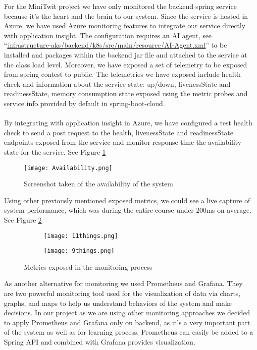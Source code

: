 For the MiniTwit project we have only monitored the backend spring service because it's the heart and the brain to our system. Since the service is hosted in Azure, we have used Azure monitoring features to integrate our service directly with application insight. The configuration requires an AI agent, see “\url{infrastructure-aks/backend/k8s/src/main/resource/AI-Agent.xml}” to be installed and packages within the backend jar file and attached to the service at the class load level. Moreover, we have exposed a set of telemetry to be exposed from spring contest to public. The telemetries we have exposed include health check and information about the service state: up/down, livenessState and readinessState, memory consumption state exposed using the metric probes and service info provided by default in spring-boot-cloud.
\\\\
By integrating with application insight in Azure, we have configured a test health check to send a post request to the health, livenessState and readinessState endpoints exposed from the service and monitor response time the availability state for the service. See Figure \ref{fig:availability} 
\begin{figure}[h]
    \centering
    \texttt{[image: Availability.png]}
    \caption{Screenshot taken of the availability of the system}
    \label{fig:availability}
\end{figure}

Using other previously mentioned exposed metrics, we could see a live capture of system performance, which was during the entire course under 200ms on average. See Figure \ref{fig:metrics} 
\begin{figure}[h]
    \centering
    \begin{subfigure}[b]{0.49\textwidth}
        \texttt{[image: 11things.png]}
    \end{subfigure}
    \hfill
        \begin{subfigure}[b]{0.49\textwidth}
        \texttt{[image: 9things.png]}
    \end{subfigure}
    \caption{Metrics exposed in the monitoring process}
    \label{fig:metrics}
\end{figure}

As another alternative for monitoring we used Prometheus and Grafana. They are two powerful monitoring tool used for the visualization of data via charts, graphs, and maps to help us understand behaviors of the system and make decisions. 
 In our project as we are using other monitoring approaches we decided to apply Prometheus and Grafana only on backend, as it's a very important part of the system as well as for learning process.
Prometheus can easily be added to a Spring API and combined with Grafana provides visualization.
